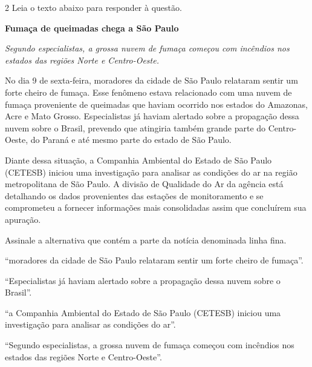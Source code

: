 \num{2} Leia o texto abaixo para responder à questão. 

\begin{myquote}
\textbf{Fumaça de queimadas chega a São Paulo}

\textit{Segundo especialistas, a grossa nuvem de fumaça começou com incêndios nos estados das regiões
Norte e Centro-Oeste.}

No dia 9 de sexta-feira, moradores da cidade de São Paulo relataram sentir
um forte cheiro de fumaça. Esse fenômeno estava relacionado com uma nuvem
de fumaça proveniente de queimadas que haviam ocorrido nos estados do
Amazonas, Acre e Mato Grosso. Especialistas já haviam alertado sobre a
propagação dessa nuvem sobre o Brasil, prevendo que atingiria também grande
parte do Centro-Oeste, do Paraná e até mesmo parte do estado de São Paulo.

Diante dessa situação, a Companhia Ambiental do Estado de São Paulo (CETESB)
iniciou uma investigação para analisar as condições do ar na região
metropolitana de São Paulo. A divisão de Qualidade do Ar da agência está
detalhando os dados provenientes das estações de monitoramento e se
comprometeu a fornecer informações mais consolidadas assim que concluírem sua
apuração.


\end{myquote}

Assinale a alternativa que contém a parte da notícia denominada linha fina.

\begin{escolha}

\item ``moradores da cidade de São Paulo relataram sentir um forte cheiro de fumaça''.

\item ``Especialistas já haviam alertado sobre a propagação dessa nuvem sobre o Brasil''.

\item ``a Companhia Ambiental do Estado de São Paulo (CETESB)
iniciou uma investigação para analisar as condições do ar''.

\item ``Segundo especialistas, a grossa nuvem de fumaça começou com incêndios nos estados das regiões
Norte e Centro-Oeste''.

\end{escolha}

